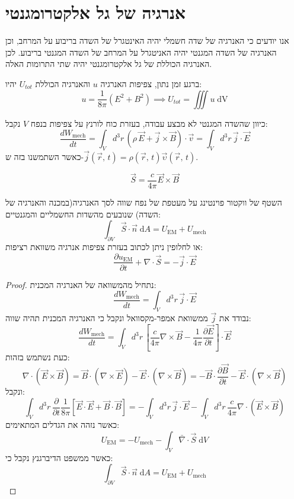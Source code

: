 \documentclass{tstextbook}
\begin{document}
\section{אנרגיה של גל אלקטרומגנטי}

אנו יודעים כי האנרגיה של שדה חשמלי יהיה האינטגרל של השדה בריבוע על המרחב, וכן האנרגיה של השדה המגנטי יהיה האניטגרל על המרחב של השדה המגנטי בריבוע. לכן האנרגיה הכוללת של גל אלקטרומגנטי יהיה שתי התרומות האלה.

\begin{proposition}
ברגע זמן נתון, צפיפות האנרגיה \(u\) והאנרגיה הכוללת \(U_{tot}\) יהיו:
$$u=\frac{1}{8\pi}\left( E^{2}+B^{2} \right)\implies U_{tot}=\iiint u \;\mathrm{dV}$$

\end{proposition}
\begin{proposition}
כיוון שהשדה המגנטי לא מבצע עבודה, בעזרת כוח לורנץ על צפיפות בנפח \(V\) נקבל:
$$\frac{d W_{\mathrm{mech}}}{d t}=\int_{V}d^{3}r\,(\rho\,\vec{E}+\vec{j}\times\vec{B})\cdot{\vec{v}}=\int_{V}d^{3}r\,\vec{j}\cdot\vec{E}$$
כאשר השתמשנו בזה ש-\(\vec{j}(\vec{r},\,t)=\rho(\vec{r},\,t){\vec{\upsilon}}(\vec{r},\,t)\). 

\end{proposition}
\begin{definition}
$${\vec S}=\frac{c}{4\pi}{\vec E}\times{\vec B}$$

\end{definition}
\begin{proposition}
השטף של ווקטור פוינטינג על מעטפת של נפח שווה לסך האנרגיה(במכנה והאנרגיה של השדה) שנובעים מהשדות החשמליים והמגנטיים:
$$\int_{\partial V}\vec{S}\cdot\vec{n}\;\mathrm{d}A=U_{\mathrm{EM}}+U_{\mathrm{mech}}$$
או לחלופין ניתן לכתוב בעזרת צפיפות אנרגיה משוואת רציפות:
$$\frac{\partial u_{\mathrm{EM}}}{\partial t}+\nabla\cdot{\vec S}=-{\vec j}\cdot{\vec E}$$

\end{proposition}
\begin{proof}
נתחיל מהמשוואה של האנרגיה המכנית:
$$\frac{d W_{\mathrm{mech}}}{d t}=\int_{V}d^{3}r\,\vec{j}\cdot\vec{E}$$
נבודד את \(\vec{j}\) ממשוואת אמפר-מקסוואל ונקבל כי האנרגיה המכנית תהיה שווה:
$$\frac{d W_{\mathrm{mech}}}{d t}=\int_{V}d^{3}r\,\left[\frac{c}{4\pi}\nabla\times{\vec B}-\frac{1}{4\pi}\frac{\partial{\vec E}}{\partial t}\right]\cdot{\vec E}$$
כעת נשתמש בזהות:
$$\nabla\cdot\left(\vec{E}\times\vec{B}\right)=\vec{B}\cdot\left(\nabla\times\vec{E}\right)-\vec{E}\cdot\left(\nabla\times\vec{B}\right)=-\vec{B}\cdot{\frac{\partial\vec{B}}{\partial t}}-\vec{E}\cdot\left(\nabla\times\vec{B}\right)$$
ונקבל:
$$\int_{V}d^{3}r\,{\frac{\partial}{\partial t}}{\frac{1}{8\pi}}\left[\vec{E}\cdot\vec{E}+\vec{B}\cdot\vec{B}\right]=-\int_{V}d^{3}r\,\vec{j}\cdot\vec{E}-\int_{V}d^{3}r\,{\frac{c}{4\pi}}\nabla\cdot\left(\vec{E}\times\vec{B}\right)$$
כאשר נזהה את הגדלים המתאימים:
$$U_{\mathrm{EM}}=-U_{\mathrm{mech}}-\int_{V}\bar{\nabla} \cdot \vec{S} \;\mathrm{d}V$$
כאשר ממשפט הדיברגנץ נקבל כי:
$$\int_{\partial V}\vec{S}\cdot\vec{n}\;\mathrm{d}A=U_{\mathrm{EM}}+U_{\mathrm{mech}}$$

\end{proof}
\end{document}
